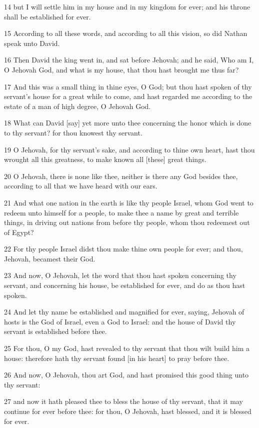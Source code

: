 \par 14 but I will settle him in my house and in my kingdom for ever; and his throne shall be established for ever.
\par 15 According to all these words, and according to all this vision, so did Nathan speak unto David.
\par 16 Then David the king went in, and sat before Jehovah; and he said, Who am I, O Jehovah God, and what is my house, that thou hast brought me thus far?
\par 17 And this was a small thing in thine eyes, O God; but thou hast spoken of thy servant's house for a great while to come, and hast regarded me according to the estate of a man of high degree, O Jehovah God.
\par 18 What can David [say] yet more unto thee concerning the honor which is done to thy servant? for thou knowest thy servant.
\par 19 O Jehovah, for thy servant's sake, and according to thine own heart, hast thou wrought all this greatness, to make known all [these] great things.
\par 20 O Jehovah, there is none like thee, neither is there any God besides thee, according to all that we have heard with our ears.
\par 21 And what one nation in the earth is like thy people Israel, whom God went to redeem unto himself for a people, to make thee a name by great and terrible things, in driving out nations from before thy people, whom thou redeemest out of Egypt?
\par 22 For thy people Israel didst thou make thine own people for ever; and thou, Jehovah, becamest their God.
\par 23 And now, O Jehovah, let the word that thou hast spoken concerning thy servant, and concerning his house, be established for ever, and do as thou hast spoken.
\par 24 And let thy name be established and magnified for ever, saying, Jehovah of hosts is the God of Israel, even a God to Israel: and the house of David thy servant is established before thee.
\par 25 For thou, O my God, hast revealed to thy servant that thou wilt build him a house: therefore hath thy servant found [in his heart] to pray before thee.
\par 26 And now, O Jehovah, thou art God, and hast promised this good thing unto thy servant:
\par 27 and now it hath pleased thee to bless the house of thy servant, that it may continue for ever before thee: for thou, O Jehovah, hast blessed, and it is blessed for ever.

